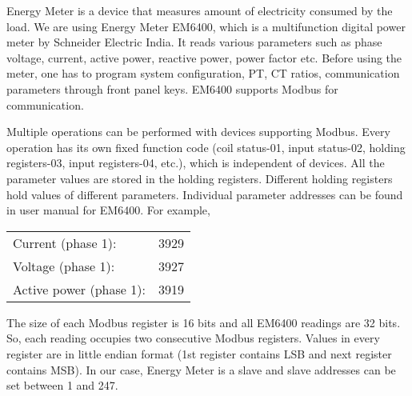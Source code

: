 Energy Meter is a device that measures amount of electricity consumed
by the load. We are using Energy Meter EM6400, which is a
multifunction digital power meter by Schneider Electric India. It
reads various parameters such as phase voltage, current, active power,
reactive power, power factor etc. Before using the meter, one has to
program system configuration, PT, CT ratios, communication parameters
through front panel keys. EM6400 supports Modbus for communication.

Multiple operations can be performed with devices supporting
Modbus. Every operation has its own fixed function code (coil
status-01, input status-02, holding registers-03, input registers-04,
etc.), which is independent of devices. All the parameter values are
stored in the holding registers. Different holding registers hold
values of different parameters. Individual parameter addresses can be
found in user manual for EM6400.  
For example,
\begin{center}
\begin{tabular}{ll}
Current (phase 1): & 3929 \\
Voltage (phase 1): & 3927 \\
Active power (phase 1): & 3919
\end{tabular}
\end{center}

The size of each Modbus register is 16 bits and all EM6400 readings
are 32 bits. So, each reading occupies two consecutive Modbus
registers. Values in every register are in little endian format (1st
register contains LSB and next register contains MSB). In our case,
Energy Meter is a slave and slave addresses can be set between 1 and
247.

